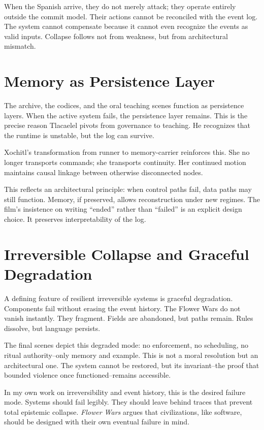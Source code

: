 \documentclass[12pt]{article}
\begin{document}
When the Spanish arrive, they do not merely attack; they operate entirely outside the commit model. Their actions cannot be reconciled with the event log. The system cannot compensate because it cannot even recognize the events as valid inputs. Collapse follows not from weakness, but from architectural mismatch.

\section*{Memory as Persistence Layer}

The archive, the codices, and the oral teaching scenes function as persistence layers. When the active system fails, the persistence layer remains. This is the precise reason Tlacaelel pivots from governance to teaching. He recognizes that the runtime is unstable, but the log can survive.

Xochitl's transformation from runner to memory-carrier reinforces this. She no longer transports commands; she transports continuity. Her continued motion maintains causal linkage between otherwise disconnected nodes.

This reflects an architectural principle: when control paths fail, data paths may still function. Memory, if preserved, allows reconstruction under new regimes. The film's insistence on writing ``ended'' rather than ``failed'' is an explicit design choice. It preserves interpretability of the log.

\section*{Irreversible Collapse and Graceful Degradation}

A defining feature of resilient irreversible systems is graceful degradation. Components fail without erasing the event history. The Flower Wars do not vanish instantly. They fragment. Fields are abandoned, but paths remain. Rules dissolve, but language persists.

The final scenes depict this degraded mode: no enforcement, no scheduling, no ritual authority--only memory and example. This is not a moral resolution but an architectural one. The system cannot be restored, but its invariant--the proof that bounded violence once functioned--remains accessible.

In my own work on irreversibility and event history, this is the desired failure mode. Systems should fail legibly. They should leave behind traces that prevent total epistemic collapse. \textit{Flower Wars} argues that civilizations, like software, should be designed with their own eventual failure in mind.
\end{document}
